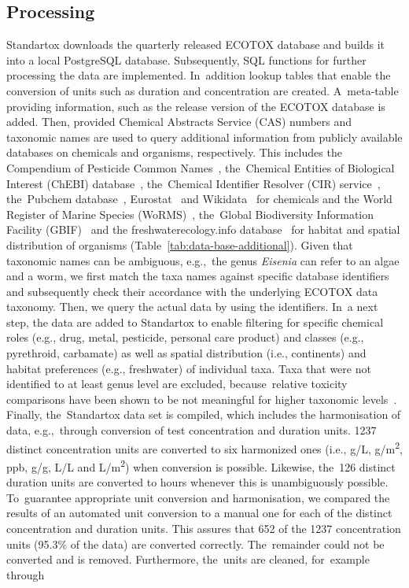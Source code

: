 \documentclass[data,datadescriptor,accept,moreauthors,pdftex]{Definitions/mdpi}
\begin{document}
\subsection{Processing}
Standartox downloads the quarterly released ECOTOX database and builds it into a local PostgreSQL database. Subsequently, SQL functions for further processing the data are implemented. In~addition lookup tables that enable the conversion of units such as duration and concentration are created. A~meta-table providing information, such as the release version of the ECOTOX database is added. Then, provided Chemical Abstracts Service (CAS) numbers and taxonomic names are used to query additional information from publicly available databases on chemicals and organisms, respectively. This includes the Compendium of Pesticide Common Names~\citep{wood_compendium_2019}, the~Chemical Entities of Biological Interest (ChEBI) database~\citep{hastings_chebi_2016}, the~Chemical Identifier Resolver (CIR) service~\citep{nationalinstitutesofhealthnih_chemical_2019}, the~Pubchem database~\citep{kim_pubchem_2016}, Eurostat~\citep{europeancommission_eurostat_2019} and Wikidata~\citep{vrandecic_wikidata_2014} for chemicals and the World Register of Marine Species (WoRMS)~\citep{wormseditorialboard_world_2020}, the~Global Biodiversity Information Facility (GBIF)~\citep{gbiftheglobalbiodiversityinformationfacility_what_2020} and the freshwaterecology.info database~\citep{schmidt-kloiber_www_2015} for habitat and spatial distribution of organisms (Table~\ref{tab:data-base-additional}). Given that taxonomic names can be ambiguous, e.g.,~the genus \textit{Eisenia} can refer to an algae and a worm, we first match the taxa names against specific database identifiers and subsequently check their accordance with the underlying ECOTOX data taxonomy. Then, we query the actual data by using the identifiers. In~a next step, the data are added to Standartox to enable filtering for specific chemical roles (e.g., drug, metal, pesticide, personal care product) and classes (e.g., pyrethroid, carbamate) as well as spatial distribution (i.e., continents) and habitat preferences (e.g., freshwater) of individual taxa. Taxa that were not identified to at least genus level are excluded, because~relative toxicity comparisons have been shown to be not meaningful for higher taxonomic levels~\citep{rainbow_trace_2002, buchwalter_differences_2005, malaj_physiological_2012}. Finally, the~Standartox data set is compiled, which includes the harmonisation of data, e.g.,~through conversion of test concentration and duration units. 1237 distinct concentration units are converted to six harmonized ones (i.e., g/L, g/m\textsuperscript{2}, ppb, g/g, L/L and L/m\textsuperscript{2}) when conversion is possible. Likewise, the~126 distinct duration units are converted to hours whenever this is unambiguously possible. To~guarantee appropriate unit conversion and harmonisation, we compared the results of an automated unit conversion to a manual one for each of the distinct concentration and duration units. This assures that 652 of the 1237 concentration units (95.3\% of the data) are converted correctly. The~remainder could not be converted and is removed.  Furthermore, the~units are cleaned, for~example through 
\end{document}
